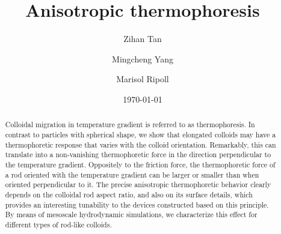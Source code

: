\documentclass[aps,pre,twocolumn,showpacs,superscriptaddress]{revtex4-1}
\begin{document}
\title{Anisotropic thermophoresis}
\author{Zihan Tan}
 \author{Mingcheng Yang}
\author{Marisol Ripoll}
\date{\today}

\begin{abstract}
  Colloidal migration in temperature gradient is referred to as
  thermophoresis. In contrast to particles with spherical shape, we
  show that elongated colloids may have a thermophoretic response that
  varies with the colloid orientation. Remarkably, this can translate
  into a non-vanishing thermophoretic force in the direction
  perpendicular to the temperature gradient. Oppositely to the
  friction force, the thermophoretic force of a rod oriented with the
  temperature gradient can be larger or smaller than when oriented
  perpendicular to it. The precise anisotropic thermophoretic behavior
  clearly depends on the colloidal rod aspect ratio, and also on its
  surface details, which provides an interesting tunability to the
  devices constructed based on this principle. By means of mesoscale
  hydrodynamic simulations, we characterize this effect for different
  types of rod-like colloids.
\end{abstract}


\maketitle
\end{document}
